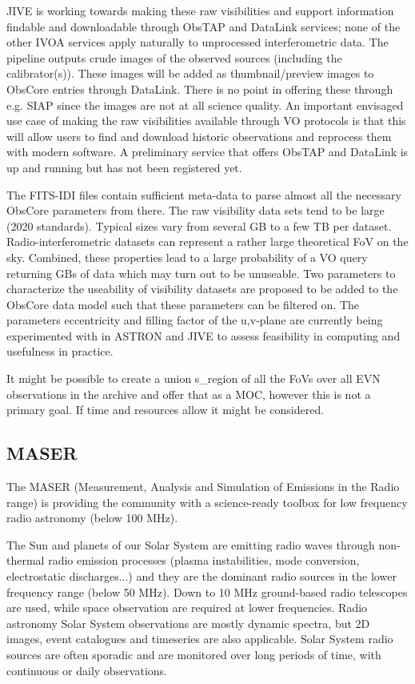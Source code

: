 \documentclass[11pt,a4paper]{ivoatex/ivoa}
\begin{document}
JIVE is working towards making these raw visibilities and support information findable and downloadable 
through ObsTAP and DataLink services; none of the other IVOA services apply naturally to unprocessed 
interferometric data. The pipeline outputs crude images of the observed sources (including the
calibrator(s)). These images will be added as thumbnail/preview images to ObsCore entries through 
DataLink. There is no point in offering these through e.g. SIAP since the images are not at all science 
quality. An important envisaged use case of making the raw visibilities available through VO protocols 
is that this will allow users to find and download historic observations and reprocess them with modern 
software.  A preliminary service that offers ObsTAP and DataLink is up and running but has not been
registered yet.

The FITS-IDI files contain sufficient meta-data to parse almost all the necessary ObsCore parameters 
from there. The raw visibility data sets tend to be large (2020 standards). Typical sizes vary from 
several GB to a few TB per dataset. Radio-interferometric datasets can represent a rather large 
theoretical FoV on the sky. Combined, these properties lead to a large probability of a VO query 
returning GBs of data which may turn out to be unuseable. Two parameters to characterize the useability 
of visibility datasets are proposed to be added to the ObsCore data model such that these parameters can 
be filtered on. The parameters eccentricity and filling factor of the u,v-plane are currently being 
experimented with in ASTRON and JIVE to assess feasibility in computing and usefulness in practice.

It might be possible to create a union s\_region of all the FoVs over all EVN observations in the 
archive and offer that as a MOC, however this is not a primary goal. If time and resources allow it 
might be considered.



\subsection{MASER}
\label{sec:maser}

The MASER (Measurement, Analysis and Simulation of Emissions in the Radio range) is providing the 
community with a science-ready toolbox for low frequency radio astronomy (below 100 MHz). 

The Sun and planets of our Solar System are emitting radio waves through non-thermal radio emission 
processes (plasma instabilities, mode conversion, electrostatic discharges...) and they are the dominant 
radio sources in the lower frequency range (below 50 MHz). Down to 10 MHz ground-based radio telescopes
are used, while space observation are required at lower frequencies. Radio astronomy Solar System 
observations are mostly dynamic spectra, but 2D images, event catalogues and timeseries are also 
applicable. Solar System radio sources are often sporadic and are monitored over long periods of time, 
with continuous or daily observations. 
\end{document}
